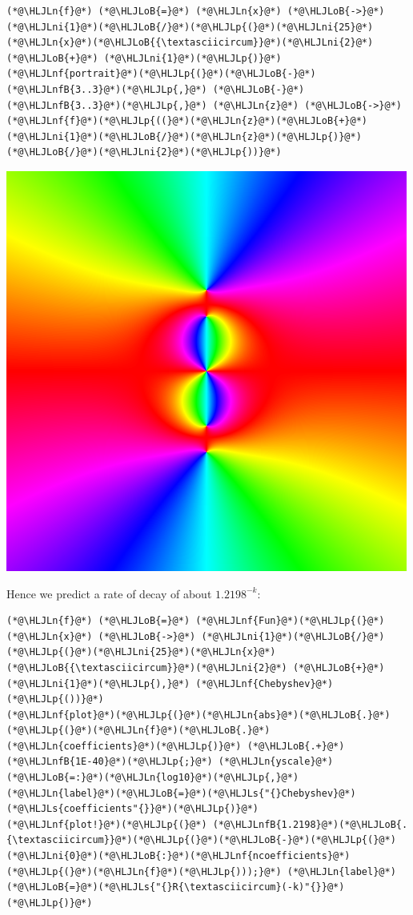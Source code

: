 \documentclass[12pt,a4paper]{article}
\newcommand{\HLJLn}[1]{#1}
\newcommand{\HLJLnf}[1]{\textcolor[RGB]{66,102,213}{#1}}
\newcommand{\HLJLs}[1]{\textcolor[RGB]{201,61,57}{#1}}
\newcommand{\HLJLnfB}[1]{\textcolor[RGB]{59,151,46}{#1}}
\newcommand{\HLJLni}[1]{\textcolor[RGB]{59,151,46}{#1}}
\newcommand{\HLJLoB}[1]{\textcolor[RGB]{102,102,102}{\textbf{#1}}}
\newcommand{\HLJLp}[1]{#1}
\begin{document}
\begin{lstlisting}
(*@\HLJLn{f}@*) (*@\HLJLoB{=}@*) (*@\HLJLn{x}@*) (*@\HLJLoB{->}@*) (*@\HLJLni{1}@*)(*@\HLJLoB{/}@*)(*@\HLJLp{(}@*)(*@\HLJLni{25}@*)(*@\HLJLn{x}@*)(*@\HLJLoB{{\textasciicircum}}@*)(*@\HLJLni{2}@*) (*@\HLJLoB{+}@*) (*@\HLJLni{1}@*)(*@\HLJLp{)}@*)
(*@\HLJLnf{portrait}@*)(*@\HLJLp{(}@*)(*@\HLJLoB{-}@*)(*@\HLJLnfB{3..3}@*)(*@\HLJLp{,}@*) (*@\HLJLoB{-}@*)(*@\HLJLnfB{3..3}@*)(*@\HLJLp{,}@*) (*@\HLJLn{z}@*) (*@\HLJLoB{->}@*) (*@\HLJLnf{f}@*)(*@\HLJLp{((}@*)(*@\HLJLn{z}@*)(*@\HLJLoB{+}@*)(*@\HLJLni{1}@*)(*@\HLJLoB{/}@*)(*@\HLJLn{z}@*)(*@\HLJLp{)}@*)(*@\HLJLoB{/}@*)(*@\HLJLni{2}@*)(*@\HLJLp{))}@*)
\end{lstlisting}

\includegraphics[width=\linewidth]{figures/Lecture21_13_1.png}

Hence we predict a rate of decay of about $1.2198^{-k}$:


\begin{lstlisting}
(*@\HLJLn{f}@*) (*@\HLJLoB{=}@*) (*@\HLJLnf{Fun}@*)(*@\HLJLp{(}@*) (*@\HLJLn{x}@*) (*@\HLJLoB{->}@*) (*@\HLJLni{1}@*)(*@\HLJLoB{/}@*)(*@\HLJLp{(}@*)(*@\HLJLni{25}@*)(*@\HLJLn{x}@*)(*@\HLJLoB{{\textasciicircum}}@*)(*@\HLJLni{2}@*) (*@\HLJLoB{+}@*) (*@\HLJLni{1}@*)(*@\HLJLp{),}@*) (*@\HLJLnf{Chebyshev}@*)(*@\HLJLp{())}@*)
(*@\HLJLnf{plot}@*)(*@\HLJLp{(}@*)(*@\HLJLn{abs}@*)(*@\HLJLoB{.}@*)(*@\HLJLp{(}@*)(*@\HLJLn{f}@*)(*@\HLJLoB{.}@*)(*@\HLJLn{coefficients}@*)(*@\HLJLp{)}@*) (*@\HLJLoB{.+}@*) (*@\HLJLnfB{1E-40}@*)(*@\HLJLp{;}@*) (*@\HLJLn{yscale}@*)(*@\HLJLoB{=:}@*)(*@\HLJLn{log10}@*)(*@\HLJLp{,}@*) (*@\HLJLn{label}@*)(*@\HLJLoB{=}@*)(*@\HLJLs{"{}Chebyshev}@*) (*@\HLJLs{coefficients"{}}@*)(*@\HLJLp{)}@*)
(*@\HLJLnf{plot!}@*)(*@\HLJLp{(}@*) (*@\HLJLnfB{1.2198}@*)(*@\HLJLoB{.{\textasciicircum}}@*)(*@\HLJLp{(}@*)(*@\HLJLoB{-}@*)(*@\HLJLp{(}@*)(*@\HLJLni{0}@*)(*@\HLJLoB{:}@*)(*@\HLJLnf{ncoefficients}@*)(*@\HLJLp{(}@*)(*@\HLJLn{f}@*)(*@\HLJLp{)));}@*) (*@\HLJLn{label}@*)(*@\HLJLoB{=}@*)(*@\HLJLs{"{}R{\textasciicircum}(-k)"{}}@*)(*@\HLJLp{)}@*)
\end{lstlisting}
\end{document}

